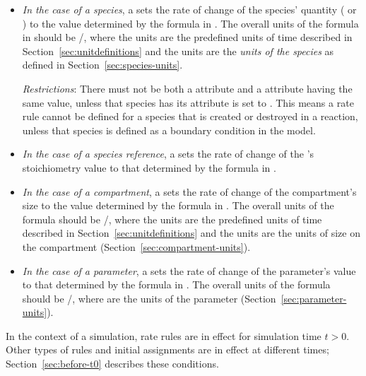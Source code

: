 \begin{itemize}
  
\item \emph{In the case of a species}, a \RateRule sets the rate
  of change of the species' quantity ( or
  ) to the value determined by the
  formula in .  The overall units of the formula in
   should be /, where the  units are
  the predefined units of time described in
  Section~\ref{sec:unitdefinitions} and the  units are the \emph{units of the species} as defined
  in Section~\ref{sec:species-units}.
  
  \emph{Restrictions}: There must not be both a \RateRule
   attribute and a \SpeciesReference {}
  attribute having the same value, unless that species has its
   attribute is set to .  This
  means a rate rule cannot be defined for a species that is
  created or destroyed in a reaction, unless that species is
  defined as a boundary condition in the model.
  
\item \emph{In the case of a species reference}, a \RateRule sets the rate
  of change of the \SpeciesReference's stoichiometry value to that 
  determined by the formula in .  
  
\item \emph{In the case of a compartment}, a \RateRule sets the
  rate of change of the compartment's size to the value determined
  by the formula in .  The overall units of the
  formula should be /, where the
   units are the predefined units of time described
  in Section~\ref{sec:unitdefinitions} and the 
  units are the units of size on the compartment
  (Section~\ref{sec:compartment-units}).

\item \emph{In the case of a parameter}, a \RateRule sets the rate
  of change of the parameter's value to that determined by the
  formula in .  The overall units of the formula should
  be /, where  are the
  units of the parameter (Section~\ref{sec:parameter-units}).

\end{itemize}

In the context of a simulation, rate rules are in effect for
simulation time $t > 0$.  Other types of rules and initial
assignments are in effect at different times;
Section~\ref{sec:before-t0} describes these conditions.

